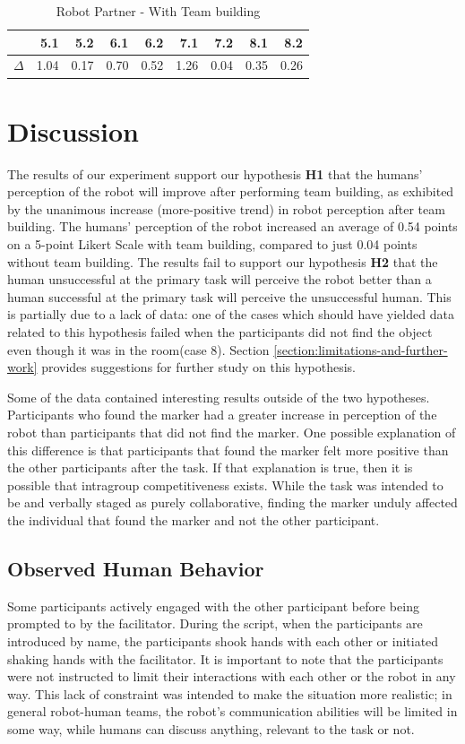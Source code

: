 \documentclass{acm_proc_article-sp}
\begin{document}
\begin{table}
\centering
\caption{Robot Partner - With Team building}
\begin{tabular}{|r|r|r|r|r|r|r|r|r|} \hline
&5.1&5.2&6.1&6.2&7.1&7.2&8.1&8.2 \\ \hline
$\Delta$&1.04&0.17&0.70&0.52&1.26&0.04&0.35&0.26 \\ \hline
\end{tabular}
\label{table:RT}
\end{table}


\section{Discussion}
\label{section:discussion}
The results of our experiment support our hypothesis \textbf{H1} that the humans' perception of the robot will improve after performing team building, as exhibited by the unanimous increase (more-positive trend) in robot perception after team building. The humans' perception of the robot increased an average of 0.54 points on a 5-point Likert Scale with team building, compared to just 0.04 points without team building.
The results fail to support our hypothesis \textbf{H2} that the human unsuccessful at the primary task will perceive the robot better than a human successful at the primary task will perceive the unsuccessful human. This is partially due to a lack of data: one of the cases which should have yielded data related to this hypothesis failed when the participants did not find the object even though it was in the room(case 8). Section \ref{section:limitations-and-further-work} provides suggestions for further study on this hypothesis.

Some of the data contained interesting results outside of the two hypotheses. Participants who found the marker had a greater increase in perception of the robot than participants that did not find the marker. One possible explanation of this difference is that participants that found the marker felt more positive than the other participants after the task. If that explanation is true, then it is possible that intragroup competitiveness exists. While the task was intended to be and verbally staged as purely collaborative, finding the marker unduly affected the individual that found the marker and not the other participant.

\subsection{Observed Human Behavior}
\label{subsection:observed-human-human-behavior}
Some participants actively engaged with the other participant before being prompted to by the facilitator. During the script, when the participants are introduced by name, the participants shook hands with each other or initiated shaking hands with the facilitator. It is important to note that the participants were not instructed to limit their interactions with each other or the robot in any way. This lack of constraint was intended to make the situation more realistic; in general robot-human teams, the robot's communication abilities will be limited in some way, while humans can discuss anything, relevant to the task or not. 
\end{document}

